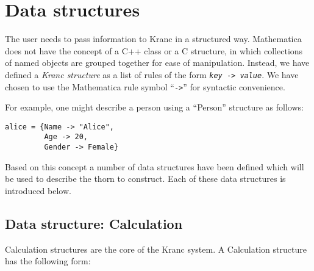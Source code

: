 \documentclass{report}
\begin{document}

\section{Data structures}

The user needs to pass information to Kranc in a structured way.
Mathematica does not have the concept of a C++ class or a C structure,
in which collections of named objects are grouped together for ease of
manipulation.  Instead, we have defined a {\em Kranc structure} as a
list of rules of the form {\tt {\it key} -> {\it value}}.  We have
chosen to use the Mathematica rule symbol ``{\tt ->}'' for syntactic
convenience.

For example, one might describe a person using a ``Person'' structure
as follows:

\begin{center}
\begin{minipage}{0.8 \textwidth}
\begin{verbatim}
alice = {Name -> "Alice",
         Age -> 20,
         Gender -> Female}
\end{verbatim}
\end{minipage}
\end{center}

Based on this concept a number of data structures have been defined
which will be used to describe the thorn to construct.  Each of these
data structures is introduced below.


\subsection{Data structure: Calculation}

Calculation structures are the core of the Kranc system.  A Calculation
structure has the following form:
\end{document}
